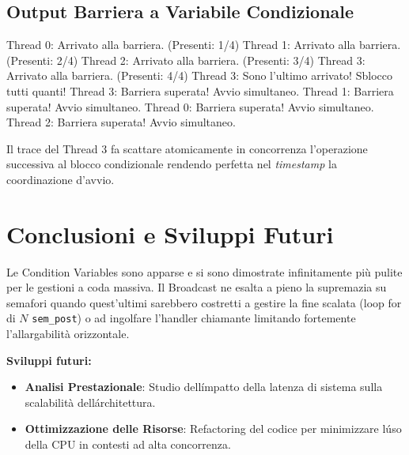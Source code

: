 \documentclass[a4paper,12pt]{article}
\begin{document}
\subsection{Output Barriera a Variabile Condizionale}
\begin{terminal}
Thread 0: Arrivato alla barriera. (Presenti: 1/4)
Thread 1: Arrivato alla barriera. (Presenti: 2/4)
Thread 2: Arrivato alla barriera. (Presenti: 3/4)
Thread 3: Arrivato alla barriera. (Presenti: 4/4)
Thread 3: Sono l'ultimo arrivato! Sblocco tutti quanti!
Thread 3: Barriera superata! Avvio simultaneo.
Thread 1: Barriera superata! Avvio simultaneo.
Thread 0: Barriera superata! Avvio simultaneo.
Thread 2: Barriera superata! Avvio simultaneo.
\end{terminal}
Il trace del Thread 3 fa scattare atomicamente in concorrenza l'operazione successiva al blocco condizionale rendendo perfetta nel \textit{timestamp} la coordinazione d'avvio.

\section{Conclusioni e Sviluppi Futuri}
Le Condition Variables sono apparse e si sono dimostrate infinitamente più pulite per le gestioni a coda massiva. Il Broadcast ne esalta a pieno la supremazia su semafori quando quest'ultimi sarebbero costretti a gestire la fine scalata (loop for di $N$ \texttt{sem\_post}) o ad ingolfare l'handler chiamante limitando fortemente l'allargabilità orizzontale. 

\noindent \textbf{Sviluppi futuri:}
\begin{itemize}
    \item \textbf{Analisi Prestazionale}: Studio dell\'impatto della latenza di sistema sulla scalabilità dell\'architettura.
    \item \textbf{Ottimizzazione delle Risorse}: Refactoring del codice per minimizzare l\'uso della CPU in contesti ad alta concorrenza.
\end{itemize}
\end{document}
